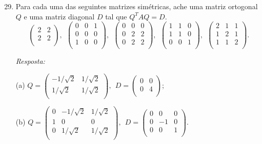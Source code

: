\documentclass[10pt]{article}
\theoremstyle{plain}
\theoremstyle{obs}
\numberwithin{equation}{section}
\begin{document}
\begin{enumerate}
 \setcounter{enumi}{28}
 \item Para cada uma das seguintes matrizes simétricas, 
 ache uma matriz ortogonal $Q$ e uma matriz diagonal $D$
 tal que $Q^{T}AQ=D$.
 $$
 \begin{pmatrix}
2 & 2 \\
2 & 2  \\
\end{pmatrix}, \ \
\begin{pmatrix}
0 & 0 & 1 \\
0 & 0 & 0 \\
1 & 0 & 0 \\
\end{pmatrix}, \ \
\begin{pmatrix}
0 & 0 & 0 \\%
0 & 2 & 2 \\
0 & 2 & 2 \\
\end{pmatrix}, \ \  
\begin{pmatrix}
1 & 1 & 0 \\
1 & 1 & 0 \\
0 & 0 & 1 \\
\end{pmatrix}, \ \
\begin{pmatrix}
2 & 1 & 1 \\%
1 & 2 & 1 \\
1 & 1 & 2 \\
\end{pmatrix}.  
 $$ 
 
 {\it Resposta:}

 (a) 
$
Q=
\begin{pmatrix}
-1/\sqrt{2} & 1/\sqrt{2} \\
1/\sqrt{2} & 1/\sqrt{2}  \\
\end{pmatrix}, \ \
D=
\begin{pmatrix}
0 & 0 \\
0 & 4  \\
\end{pmatrix}
$;

(b)
$
Q=
\begin{pmatrix}
0 & -1/\sqrt{2} & 1/\sqrt{2} \\
1 & 0 & 0 \\
0 & 1/\sqrt{2} & 1/\sqrt{2} \\
\end{pmatrix}, \ \
D=
\begin{pmatrix}
0 & 0 & 0 \\%
0 & -1 & 0 \\
0 & 0 & 1 \\
\end{pmatrix}.
$


\end{enumerate}
\end{document}
